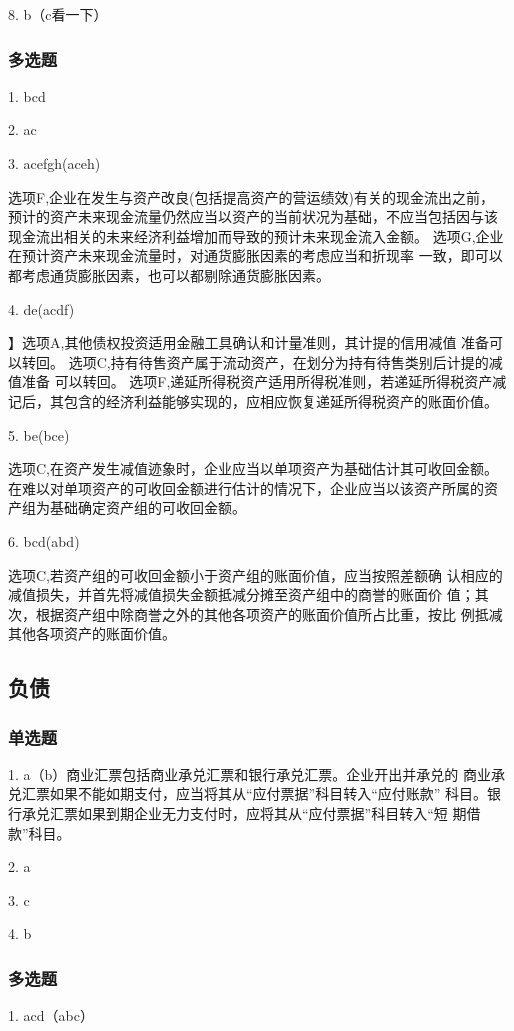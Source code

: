 \documentclass[UTF8,12pt]{ctexart}
\numberwithin{equation}{section} %
\numberwithin{figure}{section}
\numberwithin{table}{section}
\begin{document}
	8. b（c看一下）
	
	\subsubsection{多选题}
	
	1. bcd
	
	2. ac
	
	3. acefgh(aceh)
	
	选项F,企业在发生与资产改良(包括提高资产的营运绩效)有关的现金流出之前，
	预计的资产未来现金流量仍然应当以资产的当前状况为基础，不应当包括因与该
	现金流出相关的未来经济利益增加而导致的预计未来现金流入金额。
	选项G,企业在预计资产未来现金流量时，对通货膨胀因素的考虑应当和折现率
	一致，即可以都考虑通货膨胀因素，也可以都剔除通货膨胀因素。
	
	4. de(acdf)
	
	】选项A,其他债权投资适用金融工具确认和计量准则，其计提的信用减值
	准备可以转回。
	选项C,持有待售资产属于流动资产，在划分为持有待售类别后计提的减值准备
	可以转回。
	选项F,递延所得税资产适用所得税准则，若递延所得税资产减记后，其包含的经济利益能够实现的，应相应恢复递延所得税资产的账面价值。
	
	5. be(bce)
	
	选项C,在资产发生减值迹象时，企业应当以单项资产为基础估计其可收回金额。
	在难以对单项资产的可收回金额进行估计的情况下，企业应当以该资产所属的资
	产组为基础确定资产组的可收回金额。
	
	6. bcd(abd)
	
	选项C,若资产组的可收回金额小于资产组的账面价值，应当按照差额确
	认相应的减值损失，并首先将减值损失金额抵减分摊至资产组中的商誉的账面价
	值；其次，根据资产组中除商誉之外的其他各项资产的账面价值所占比重，按比
	例抵减其他各项资产的账面价值。
	
	\subsection{负债}
	\subsubsection{单选题}
	1. a（b）商业汇票包括商业承兑汇票和银行承兑汇票。企业开出并承兑的
	商业承兑汇票如果不能如期支付，应当将其从“应付票据”科目转入“应付账款”
	科目。银行承兑汇票如果到期企业无力支付时，应将其从“应付票据”科目转入“短
	期借款”科目。
	
	2. a
	
	3. c
	
	4. b
	
	\subsubsection{多选题}
	1. acd（abc）
	
\end{document}
